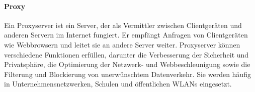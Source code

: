\paragraph{Proxy}

Ein Proxyserver ist ein Server, der als Vermittler zwischen Clientgeräten und anderen Servern im Internet fungiert. Er empfängt Anfragen von Clientgeräten wie Webbrowsern und leitet sie an andere Server weiter. Proxyserver können verschiedene Funktionen erfüllen, darunter die Verbesserung der Sicherheit und Privatsphäre, die Optimierung der Netzwerk- und Webbeschleunigung sowie die Filterung und Blockierung von unerwünschtem Datenverkehr. Sie werden häufig in Unternehmensnetzwerken, Schulen und öffentlichen WLANs eingesetzt.


\clearpage